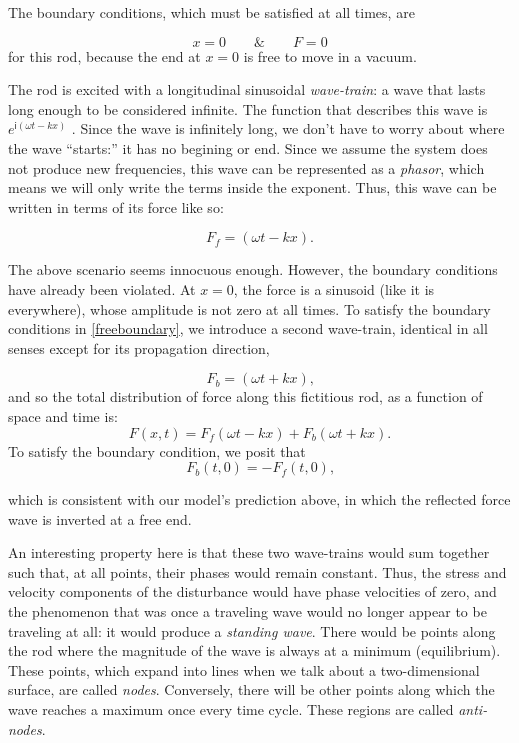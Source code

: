 \documentclass[a4paper,10pt]{report}
\numberwithin{equation}{section}
\begin{document}
The boundary conditions, which must be satisfied at all times, are

\begin{equation}
 x = 0 \qquad \text{\&} \qquad F = 0
 \label{freeboundary}
\end{equation}
for this rod, because the end at $x=0$ is free to move in a vacuum.

The rod is excited with a longitudinal sinusoidal \emph{wave-train}: a wave that lasts long enough to be considered infinite. The function that describes this wave is $e^{\mathsf{i}(\omega t - kx)}$ . Since the wave is infinitely long, we don't have to worry about where the wave ``starts:'' it has no begining or end. Since we assume the system does not produce new frequencies, this wave can be represented as a \emph{phasor}, which means we will only write the terms inside the exponent. Thus, this wave can be written in terms of its force like so:

\begin{equation}
F_f = (\omega t - kx) \text{.}
\end{equation}

The above scenario seems innocuous enough. However, the boundary conditions have already been violated. At $x=0$, the force is a sinusoid (like it is everywhere), whose amplitude is not zero at all times. To satisfy the boundary conditions in \eqref{freeboundary}, we introduce a second wave-train, identical in all senses except for its propagation direction,

\begin{equation}
F_b = (\omega t + kx) \text{,}
\end{equation}
and so the total distribution of force along this fictitious rod, as a function of space and time is:
\begin{equation}
F(x, t) = F_f (\omega t - kx) + F_b (\omega t + kx) \text{.}
\end{equation}
To satisfy the boundary condition, we posit that
\begin{equation}
F_b (t, 0) = -F_f (t, 0) \text{,}
\end{equation}

which is consistent with our model's prediction above, in which the reflected force wave is inverted at a free end. \cite[p.~116]{Cremer1973}

An interesting property here is that these two wave-trains would sum together such that, at all points, their phases would remain constant. Thus, the stress and velocity components of the disturbance would have phase velocities of zero, and the phenomenon that was once a traveling wave would no longer appear to be traveling at all: it would produce a \emph{standing wave}. There would be points along the rod where the magnitude of the wave is always at a minimum (equilibrium). These points, which expand into lines when we talk about a two-dimensional surface, are called \emph{nodes}. Conversely, there will be other points along which the wave reaches a maximum once every time cycle. These regions are called \emph{anti-nodes}. 
\end{document}
